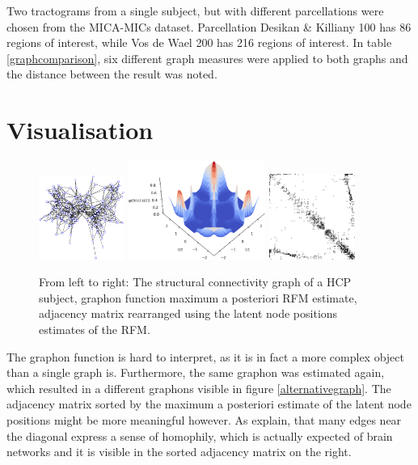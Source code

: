 \documentclass[11pt]{report} %
\begin{document}
Two tractograms from a single subject, but with different parcellations were chosen from the MICA-MICs dataset. Parcellation Desikan \& Killiany 100 has 86 regions of interest, while Vos de Wael 200 has 216 regions of interest. In table \ref{graphcomparison}, six different graph measures were applied to both graphs and the distance between the result was noted. 
\section{Visualisation}
\begin{figure}[H]
    \center
    \includegraphics[width= 0.25\textwidth]{subject_graph}%
    \hfill
    \includegraphics[width= 0.4\textwidth]{graphon_100307}%
    \hfill
    \includegraphics[width= 0.25\textwidth]{eldrichgod}%
    \caption{From left to right: The structural connectivity graph of a HCP subject, graphon function maximum a posteriori RFM estimate, adjacency matrix rearranged using the latent node positions estimates of the RFM.}
    \label{visualisation 1}
\end{figure}
The graphon function is hard to interpret, as it is in fact a more complex object than a single graph is. Furthermore, the same graphon was estimated again, which resulted in a different graphons visible in figure \ref{alternativegraph}. The adjacency matrix sorted by the maximum a posteriori estimate of the latent node positions might be more meaningful however. As  explain, that many edges near the diagonal express a sense of homophily, which is actually expected of brain networks \cite{larivi2019} and it is visible in the sorted adjacency matrix on the right.
\end{document}
